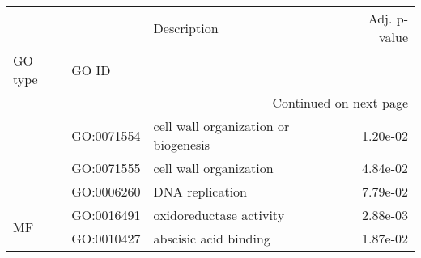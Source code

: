 \begin{longtable}{lllr}
\toprule
   &            &                           Description &  Adj. p-value \\
GO type & GO ID &                                       &               \\
\midrule
\endhead
\midrule
\multicolumn{4}{r}{{Continued on next page}} \\
\midrule
\endfoot

\bottomrule
\endlastfoot
\multirow{3}{*}{BP} & GO:0071554 &  cell wall organization or biogenesis &      1.20e-02 \\
   & GO:0071555 &                cell wall organization &      4.84e-02 \\
   & GO:0006260 &                       DNA replication &      7.79e-02 \\
\cline{1-4}
\multirow{2}{*}{MF} & GO:0016491 &               oxidoreductase activity &      2.88e-03 \\
   & GO:0010427 &                 abscisic acid binding &      1.87e-02 \\
\end{longtable}